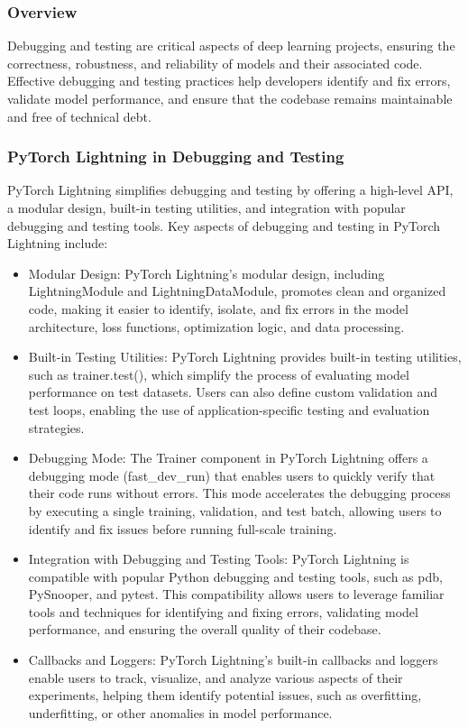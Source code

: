 \documentclass[12pt]{article}
\begin{document}
\subsubsection{Overview}

Debugging and testing are critical aspects of deep learning projects, ensuring the correctness, robustness, and reliability of models and their associated code. Effective debugging and testing practices help developers identify and fix errors, validate model performance, and ensure that the codebase remains maintainable and free of technical debt.

\subsubsection{PyTorch Lightning in Debugging and Testing}

PyTorch Lightning simplifies debugging and testing by offering a high-level API, a modular design, built-in testing utilities, and integration with popular debugging and testing tools. Key aspects of debugging and testing in PyTorch Lightning include:

\begin{itemize}
    \item Modular Design: PyTorch Lightning's modular design, including LightningModule and LightningDataModule, promotes clean and organized code, making it easier to identify, isolate, and fix errors in the model architecture, loss functions, optimization logic, and data processing.
    \item Built-in Testing Utilities: PyTorch Lightning provides built-in testing utilities, such as trainer.test(), which simplify the process of evaluating model performance on test datasets. Users can also define custom validation and test loops, enabling the use of application-specific testing and evaluation strategies.
    \item Debugging Mode: The Trainer component in PyTorch Lightning offers a debugging mode (fast\_dev\_run) that enables users to quickly verify that their code runs without errors. This mode accelerates the debugging process by executing a single training, validation, and test batch, allowing users to identify and fix issues before running full-scale training.
    \item Integration with Debugging and Testing Tools: PyTorch Lightning is compatible with popular Python debugging and testing tools, such as pdb, PySnooper, and pytest. This compatibility allows users to leverage familiar tools and techniques for identifying and fixing errors, validating model performance, and ensuring the overall quality of their codebase.
    \item Callbacks and Loggers: PyTorch Lightning's built-in callbacks and loggers enable users to track, visualize, and analyze various aspects of their experiments, helping them identify potential issues, such as overfitting, underfitting, or other anomalies in model performance.
\end{itemize}
\end{document}
